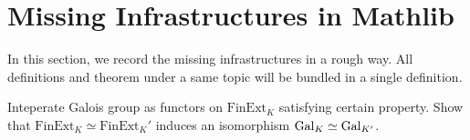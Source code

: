 \section{Missing Infrastructures in Mathlib}
In this section, we record the missing infrastructures in a rough way. All definitions and theorem under a same topic will be bundled in a single definition.

\begin{definition}
    \label{Relate Galois Group with Category of Finite Field Extensions}
    \notready

    Inteperate Galois group as functors on $ \text{FinExt}_K $ satisfying certain property. Show that $\text{FinExt}_K \simeq \text{FinExt}_K'$ induces an isomorphism $\operatorname{Gal}_K \simeq \operatorname{Gal}_{K'}$.
\end{definition}